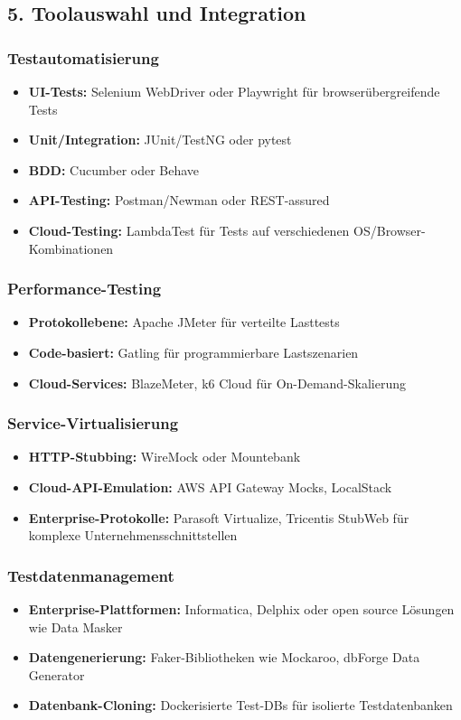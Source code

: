 \subsection{5. Toolauswahl und Integration}
\subsubsection{Testautomatisierung}

\begin{itemize}
    \item \textbf{UI-Tests:}  Selenium WebDriver oder Playwright für browserübergreifende Tests
    \item \textbf{Unit/Integration:} JUnit/TestNG oder pytest
    \item \textbf{BDD:} Cucumber oder Behave
    \item \textbf{API-Testing:} Postman/Newman oder REST-assured
    \item \textbf{Cloud-Testing:} LambdaTest für Tests auf verschiedenen OS/Browser-Kombinationen
\end{itemize}

\subsubsection{Performance-Testing}
\begin{itemize}
    \item \textbf{Protokollebene:} Apache JMeter für verteilte Lasttests
    \item \textbf{Code-basiert:} Gatling für programmierbare Lastszenarien
    \item \textbf{Cloud-Services:} BlazeMeter, k6 Cloud für On-Demand-Skalierung
\end{itemize}

\subsubsection{Service-Virtualisierung}
\begin{itemize}
    \item \textbf{HTTP-Stubbing:} WireMock oder Mountebank
    \item \textbf{Cloud-API-Emulation:} AWS API Gateway Mocks, LocalStack
    \item \textbf{Enterprise-Protokolle:} Parasoft Virtualize, Tricentis StubWeb für komplexe
    Unternehmensschnittstellen
\end{itemize}

\subsubsection{Testdatenmanagement}
\begin{itemize}
    \item \textbf{Enterprise-Plattformen:} Informatica, Delphix oder open source Lösungen wie
    Data Masker
    \item \textbf{Datengenerierung:} Faker-Bibliotheken wie Mockaroo, dbForge Data Generator
    \item \textbf{Datenbank-Cloning:} Dockerisierte Test-DBs für isolierte Testdatenbanken
\end{itemize}

